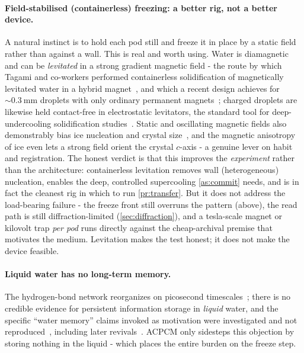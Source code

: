 \documentclass[11pt]{article}
\theoremstyle{definition}
\begin{document}
\paragraph{Field-stabilised (containerless) freezing: a better rig, not a better device.}
A natural instinct is to hold each pod still and freeze it in place by a static field rather
than against a wall. This is real and worth using. Water is diamagnetic and can be
\emph{levitated} in a strong gradient magnetic field - the route by which Tagami and
co-workers performed containerless solidification of magnetically levitated water in a hybrid
magnet~\cite{tagami1999maglev}, and which a recent design achieves for ${\sim}\qty{0.3}{\milli\meter}$
droplets with only ordinary permanent magnets~\cite{naito2024diamaglev}; charged droplets are
likewise held contact-free in electrostatic levitators, the standard tool for
deep-undercooling solidification studies~\cite{rhim1993esl}. Static and oscillating magnetic
fields also demonstrably bias ice nucleation and crystal size~\cite{otero2016magnetic}, and the magnetic
anisotropy of ice even lets a strong field orient the crystal $c$-axis - a genuine lever on
habit and registration. The honest verdict is that this improves the \emph{experiment} rather
than the architecture: containerless levitation removes wall (heterogeneous) nucleation,
enables the deep, controlled supercooling \cref{as:commit} needs, and is in fact the cleanest
rig in which to run \cref{pr:transfer}. But it does not address the load-bearing failure - the
freeze front still overruns the pattern (above), the read path is still diffraction-limited
(\cref{sec:diffraction}), and a tesla-scale magnet or kilovolt trap \emph{per pod} runs
directly against the cheap-archival premise that motivates the medium. Levitation makes the
test honest; it does not make the device feasible.

\paragraph{Liquid water has no long-term memory.}
The hydrogen-bond network reorganizes on picosecond timescales~\cite{cowan2005water}; there
is no credible evidence for persistent information storage in \emph{liquid} water, and the
specific ``water memory'' claims invoked as motivation were investigated and not
reproduced~\cite{maddox1988,benveniste1988}, including later
revivals~\cite{montagnier2009}. ACPCM only sidesteps this objection by storing nothing in
the liquid - which places the entire burden on the freeze step.
\end{document}
